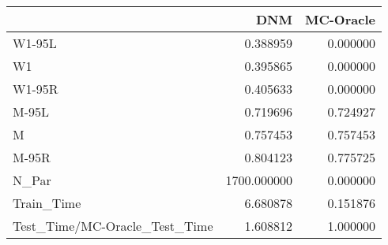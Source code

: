 \begin{tabular}{lrr}
\toprule
{} &          DNM &  MC-Oracle \\
\midrule
W1-95L                        &     0.388959 &   0.000000 \\
W1                            &     0.395865 &   0.000000 \\
W1-95R                        &     0.405633 &   0.000000 \\
M-95L                         &     0.719696 &   0.724927 \\
M                             &     0.757453 &   0.757453 \\
M-95R                         &     0.804123 &   0.775725 \\
N\_Par                         &  1700.000000 &   0.000000 \\
Train\_Time                    &     6.680878 &   0.151876 \\
Test\_Time/MC-Oracle\_Test\_Time &     1.608812 &   1.000000 \\
\bottomrule
\end{tabular}
